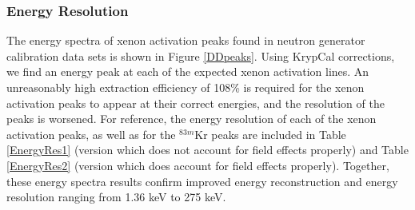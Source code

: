 \begin{figure} [!h]
\centering
{}
\qquad
{}
\label{LifetimeCompare}
\end{figure}


\subsubsection{Energy Resolution}

The energy spectra of xenon activation peaks found in neutron generator calibration data sets is shown in Figure \ref{DDpeaks}.  Using KrypCal corrections, we find an energy peak at each of the expected xenon activation lines.  An unreasonably high extraction efficiency of 108\% is required for the xenon activation peaks to appear at their correct energies, and the resolution of the peaks is worsened.  For reference, the energy resolution of each of the xenon activation peaks, as well as for the $^{83m}$Kr peaks are included in Table \ref{EnergyRes1} (version which does not account for field effects properly) and Table \ref{EnergyRes2} (version which does account for field effects properly). Together, these energy spectra results confirm improved energy reconstruction and energy resolution ranging from 1.36 keV to 275 keV.  

